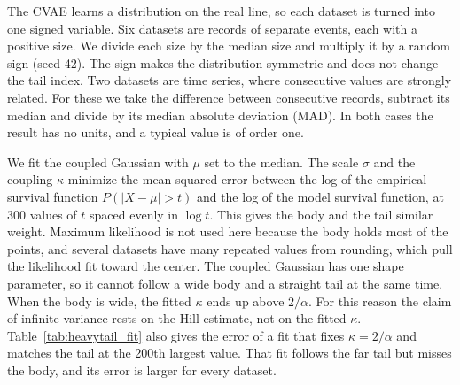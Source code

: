 \documentclass[twoside,11pt]{article}
\begin{document}
The CVAE learns a distribution on the real line, so each dataset is turned into one signed variable. Six datasets are records of separate events, each with a positive size. We divide each size by the median size and multiply it by a random sign (seed 42). The sign makes the distribution symmetric and does not change the tail index. Two datasets are time series, where consecutive values are strongly related. For these we take the difference between consecutive records, subtract its median and divide by its median absolute deviation (MAD). In both cases the result has no units, and a typical value is of order one.

We fit the coupled Gaussian with $\mu$ set to the median. The scale $\sigma$ and the coupling $\kappa$ minimize the mean squared error between the log of the empirical survival function $P(|X-\mu|>t)$ and the log of the model survival function, at 300 values of $t$ spaced evenly in $\log t$. This gives the body and the tail similar weight. Maximum likelihood is not used here because the body holds most of the points, and several datasets have many repeated values from rounding, which pull the likelihood fit toward the center. The coupled Gaussian has one shape parameter, so it cannot follow a wide body and a straight tail at the same time. When the body is wide, the fitted $\kappa$ ends up above $2/\alpha$. For this reason the claim of infinite variance rests on the Hill estimate, not on the fitted $\kappa$. Table~\ref{tab:heavytail_fit} also gives the error of a fit that fixes $\kappa=2/\alpha$ and matches the tail at the 200th largest value. That fit follows the far tail but misses the body, and its error is larger for every dataset.
\end{document}
